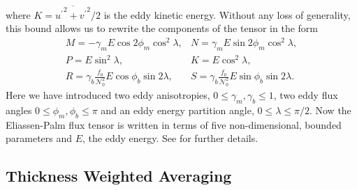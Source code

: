 \documentclass[12pt,a4paper]{report}
\newcommand*\mean[1]{\overline{#1}}
\newcommand*\res[1]{{#1}^{\prime}}
\begin{document}
                 where $K={\mean{{\res{u}}^{2} + {\res{v}}^{2}}}/{2}$ is the eddy
                 kinetic energy.
                 Without any loss of generality, this bound allows us to rewrite the components of the tensor in the form
                 \begin{equation}
                 \begin{array}{cc}
                 M = -\gamma_{m}E\cos{2\phi_{m}}\cos^{2}{\lambda}, & 
                 N = \gamma_{m}E\sin{2\phi_{m}}\cos^{2}{\lambda}, \\
                 P =  E\sin^{2}{\lambda}, &  K =  E\cos^{2}{\lambda},  \\
                 R =  \gamma_{b}\frac{f_{0}}{\mathcal{N}_{0}^{2}}E\cos{\phi_{b}}\sin{2\lambda}, &
                 S = \gamma_{b}\frac{f_{0}}{\mathcal{N}_{0}^{2}}E\sin{\phi_{b}}\sin{2\lambda} .
                 \end{array} 
                 \end{equation}
                 Here we have introduced two eddy anisotropies, $0\leq\gamma_{m},\gamma_{b}\leq1$, two eddy flux angles $0\leq\phi_{m},\phi_{b}\leq\pi$ and an eddy energy partition angle,
                 $0\leq\lambda\leq\pi/2$. Now the Eliassen-Palm flux tensor
                 is written in terms of five non-dimensional, bounded parameters
                 and $E$, the eddy energy. See \cite{marshall2012framework} for further details.
                 
                 
                 
                 \subsection{Thickness Weighted Averaging}
                 \label{youngtwa}
                 
\end{document}
